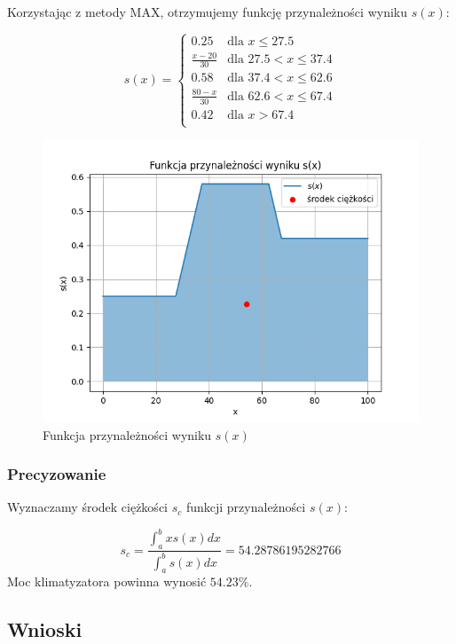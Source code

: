 \documentclass{article}
\begin{document}
Korzystając z metody MAX, otrzymujemy funkcję przynależności
wyniku $s(x)$:

\begin{equation}
    s(x) = \begin{cases}
        0.25 & \text{dla } x \leq 27.5 \\
        \frac{x - 20}{30} & \text{dla } 27.5 < x \leq 37.4 \\
        0.58 & \text{dla } 37.4 < x \leq 62.6 \\
        \frac{80 - x}{30} & \text{dla } 62.6 < x \leq 67.4 \\
        0.42 & \text{dla } x > 67.4 \\
    \end{cases}
\end{equation}

\begin{figure}[H]
    \centering
    \includegraphics[width=0.8\linewidth]{Zad1/composition.png}
    \caption{Funkcja przynależności wyniku $s(x)$}
\end{figure}

\subsubsection*{Precyzowanie}

Wyznaczamy środek ciężkości $s_c$ funkcji przynależności $s(x)$:

\begin{equation}
    s_c = \frac{\int_{a}^{b} x s(x) dx}{\int_{a}^{b} s(x) dx} = 54.28786195282766
\end{equation}
Moc klimatyzatora powinna wynosić $54.23 \%$.

\subsection{Wnioski}
\end{document}
